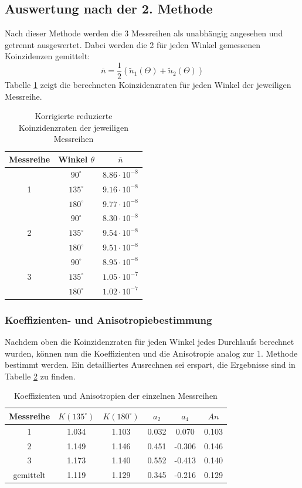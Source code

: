 \documentclass[a4paper,titlepage]{scrartcl}
\numberwithin{equation}{section}
\begin{document}
\subsection{Auswertung nach der 2. Methode}
Nach dieser Methode werden die 3 Messreihen als unabhängig angesehen und getrennt ausgewertet. Dabei werden die 2 für jeden Winkel gemessenen Koinzidenzen gemittelt:
\begin{equation*}
\overline{n}=\frac{1}{2}(\tilde{n}_1(\Theta) + \tilde{n}_2(\Theta))
\end{equation*}
Tabelle \ref{tab:separatedCoincidence} zeigt die berechneten Koinzidenzraten für jeden Winkel der jeweiligen Messreihe.
\begin{table}[H]
\centering
\begin{tabular}{c|c|c}
Messreihe & Winkel $\theta$ & $\overline{n}$\\
\hline
\multirow{3}{*}{1} & $90^{\circ}$ & $8.86 \cdot 10^{-8}$\\
& $135^{\circ}$ & $9.16 \cdot 10^{-8}$\\
& $180^{\circ}$ & $9.77 \cdot 10^{-8}$\\
\hline
\multirow{3}{*}{2} & $90^{\circ}$ & $8.30 \cdot 10^{-8}$\\
& $135^{\circ}$ & $9.54 \cdot 10^{-8}$\\
& $180^{\circ}$ & $9.51 \cdot 10^{-8}$\\
\hline
\multirow{3}{*}{3} & $90^{\circ}$ & $8.95 \cdot 10^{-8}$\\
& $135^{\circ}$ & $1.05 \cdot 10^{-7}$\\
& $180^{\circ}$ & $1.02 \cdot 10^{-7}$\\
\end{tabular}
\caption{Korrigierte reduzierte Koinzidenzraten der jeweiligen Messreihen}
\label{tab:separatedCoincidence}
\end{table}
\subsubsection{Koeffizienten- und Anisotropiebestimmung}
Nachdem oben die Koinzidenzraten für jeden Winkel jedes Durchlaufs berechnet wurden, können nun die Koeffizienten und die Anisotropie analog zur 1. Methode bestimmt werden. Ein detailliertes Ausrechnen sei erspart, die Ergebnisse sind in Tabelle \ref{tab:auswertungMethode2} zu finden.
\begin{table}[H]
\centering
\begin{tabular}{c|c|c|c|c|c}
Messreihe & $K(135^{\circ})$ & $K(180^{\circ})$ & $a_2$ & $a_4$ & $An$ \\
\hline
1 & 1.034 & 1.103& 0.032 & 0.070 & 0.103\\
2 & 1.149 & 1.146 & 0.451 & -0.306 & 0.146\\
3 & 1.173 & 1.140 & 0.552 & -0.413 & 0.140\\
\hline
gemittelt & 1.119 & 1.129 & 0.345 & -0.216 & 0.129\\
\end{tabular}
\caption{Koeffizienten und Anisotropien der einzelnen Messreihen}
\label{tab:auswertungMethode2}
\end{table}
\end{document}
